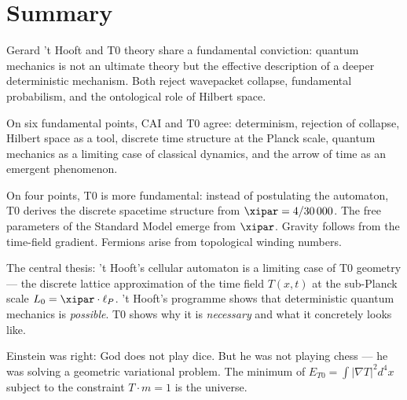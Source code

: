 \clearpage

\section{Summary}
\label{sec:summary}

Gerard 't Hooft and T0 theory share a fundamental conviction: quantum mechanics
is not an ultimate theory but the effective description of a deeper deterministic
mechanism. Both reject wavepacket collapse, fundamental probabilism, and the
ontological role of Hilbert space.

On six fundamental points, CAI and T0 agree: determinism, rejection of collapse,
Hilbert space as a tool, discrete time structure at the Planck scale, quantum
mechanics as a limiting case of classical dynamics, and the arrow of time as
an emergent phenomenon.

On four points, T0 is more fundamental: instead of postulating the automaton,
T0 derives the discrete spacetime structure from $\xipar = 4/30\,000$. The free
parameters of the Standard Model emerge from $\xipar$. Gravity follows from
the time-field gradient. Fermions arise from topological winding numbers.

The central thesis: 't Hooft's cellular automaton is a limiting case of T0
geometry — the discrete lattice approximation of the time field $T(x,t)$ at
the sub-Planck scale $L_0 = \xipar \cdot \ell_P$. 't Hooft's programme shows
that deterministic quantum mechanics is \emph{possible}. T0 shows why it is
\emph{necessary} and what it concretely looks like.

\begin{philosophical}
    Einstein was right: God does not play dice. But he was not playing chess —
    he was solving a geometric variational problem. The minimum of
    $E_{T0} = \int |\nabla T|^2 d^4x$ subject to the constraint $T \cdot m = 1$
    is the universe.
\end{philosophical}

